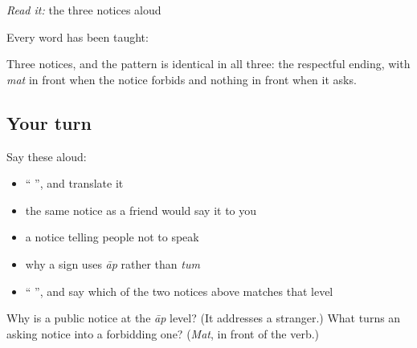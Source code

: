 \begin{tcolorbox}[breakable,skin=enhanced,colback=orange!6,colframe=orange!45!black,boxrule=0.5pt,arc=1mm,left=6pt,right=6pt,top=4pt,bottom=4pt,fonttitle=\bfseries,title={Read this}]
\emph{Read it:} the three notices aloud

Every word has been taught:

\begin{quote}
       
\end{quote}

Three notices, and the pattern is identical in all three: the respectful ending, with \emph{mat} in front when the notice forbids and nothing in front when it asks.
\end{tcolorbox}

\subsection*{Your turn}
Say these aloud:

\begin{itemize}
\raggedright
  \item \textquotedblleft{}  \textquotedblright{}, and translate it
  \item the same notice as a friend would say it to you
  \item a notice telling people not to speak
  \item why a sign uses \emph{āp} rather than \emph{tum}
  \item \textquotedblleft{} \textquotedblright{}, and say which of the two notices above matches that level
\end{itemize}

\begin{tcolorbox}[breakable,colback=teal!4,colframe=teal!35!black,title={Before you move on}]
Why is a public notice at the \emph{āp} level? (It addresses a stranger.) What turns an asking notice into a forbidding one? (\emph{Mat}, in front of the verb.)
\end{tcolorbox}
